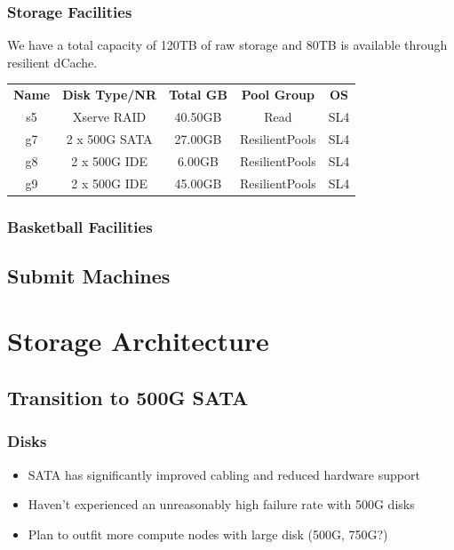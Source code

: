 \documentclass{beamer}
\begin{document}
\begin{frame}
\frametitle{Storage Facilities}
We have a total capacity of 120TB of raw storage and 80TB is available through 
resilient dCache.

\vspace{.4cm}

\begin{tabular}[c]{|c|c|c|c|c|}
\hline
{\bf Name}   & {\bf Disk Type/NR} & {\bf Total GB}  & {\bf Pool Group}  & {\bf OS} \\
s5  & Xserve RAID   & 40.50GB   & Read              & SL4 \\
g7  & 2 x 500G SATA & 27.00GB   & ResilientPools    & SL4 \\
g8  & 2 x 500G IDE  & 6.00GB    & ResilientPools    & SL4 \\
g9  & 2 x 500G IDE  & 45.00GB   & ResilientPools    & SL4 \\
\hline
\end{tabular}
\end{frame}

\begin{frame}
\frametitle{Basketball Facilities}
\end{frame}

\subsection{Submit Machines}

\section{Storage Architecture}
\subsection{Transition to 500G SATA}
\begin{frame}
\frametitle{Disks}
\begin{itemize}
    \item SATA has significantly improved cabling and reduced hardware support
    \item Haven't experienced an unreasonably high failure rate with 500G disks
    \item Plan to outfit more compute nodes with large disk (500G, 750G?)
\end{itemize}
\end{frame}
\end{document}
